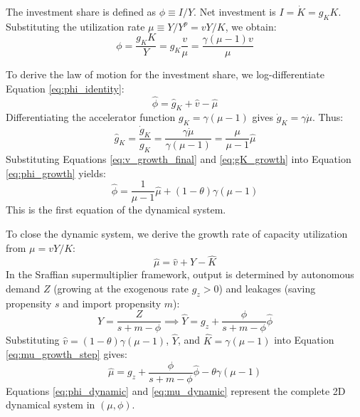 \documentclass[12pt, a4paper]{article}
\theoremstyle{definition}
\theoremstyle{remark}
\begin{document}
The investment share is defined as $\phi \equiv I/Y$. Net investment is $I = \dot{K} = g_K K$. Substituting the utilization rate $\mu \equiv Y/Y^p = v Y / K$, we obtain:
\begin{equation} \label{eq:phi_identity}
    \phi = \frac{g_K K}{Y} = g_K \frac{v}{\mu} = \frac{\gamma(\mu - 1)v}{\mu}
\end{equation}

To derive the law of motion for the investment share, we log-differentiate Equation \eqref{eq:phi_identity}:
\begin{equation} \label{eq:phi_growth}
    \hat{\phi} = \hat{g}_K + \hat{v} - \hat{\mu}
\end{equation}
Differentiating the accelerator function $g_K = \gamma(\mu - 1)$ gives $\dot{g}_K = \gamma \dot{\mu}$. Thus:
\begin{equation} \label{eq:gK_growth}
    \hat{g}_K = \frac{\dot{g}_K}{g_K} = \frac{\gamma \dot{\mu}}{\gamma(\mu - 1)} = \frac{\mu}{\mu - 1}\hat{\mu}
\end{equation}
Substituting Equations \eqref{eq:v_growth_final} and \eqref{eq:gK_growth} into Equation \eqref{eq:phi_growth} yields:
\begin{equation} \label{eq:phi_dynamic}
    \hat{\phi} = \frac{1}{\mu - 1}\hat{\mu} + (1 - \theta)\gamma(\mu - 1)
\end{equation}
This is the first equation of the dynamical system.

To close the dynamic system, we derive the growth rate of capacity utilization from $\mu = v Y / K$:
\begin{equation} \label{eq:mu_growth_step}
    \hat{\mu} = \hat{v} + \hat{Y} - \hat{K}
\end{equation}
In the Sraffian supermultiplier framework, output is determined by autonomous demand $Z$ (growing at the exogenous rate $g_z > 0$) and leakages (saving propensity $s$ and import propensity $m$):
\begin{equation} \label{eq:supermultiplier}
    Y = \frac{Z}{s + m - \phi} \implies \hat{Y} = g_z + \frac{\phi}{s + m - \phi}\hat{\phi}
\end{equation}
Substituting $\hat{v} = (1 - \theta)\gamma(\mu - 1)$, $\hat{Y}$, and $\hat{K} = \gamma(\mu - 1)$ into Equation \eqref{eq:mu_growth_step} gives:
\begin{equation} \label{eq:mu_dynamic}
    \hat{\mu} = g_z + \frac{\phi}{s + m - \phi}\hat{\phi} - \theta\gamma(\mu - 1)
\end{equation}
Equations \eqref{eq:phi_dynamic} and \eqref{eq:mu_dynamic} represent the complete 2D dynamical system in $(\mu, \phi)$.
\end{document}
